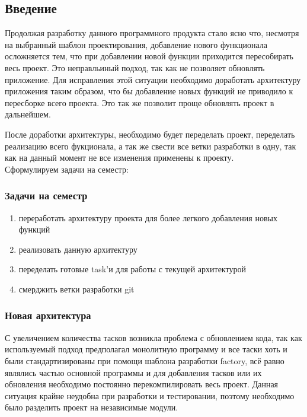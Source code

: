 \subsection{Введение}

Продолжая разработку данного программного продукта стало ясно что, несмотря на выбранный шаблон проектирования, добавление нового функционала осложняется тем, что при добавлении новой функции приходится пересобирать весь проект. Это неправльиный подход, так как не позволяет обновлять приложение. Для исправления этой ситуации необходимо доработать архитектуру приложения таким образом, что бы добавление новых функций не приводило к пересборке всего проекта. Это так же позволит проще обновлять проект в дальнейшем. 

После доработки архитектуры, необходимо будет переделать проект, переделать реализацию всего фукционала, а так же свести все ветки разработки в одну, так как на данный момент не все изменения применены к проекту. \\
Сформулируем задачи на семестр:

\subsubsection{Задачи на семестр}

\begin{enumerate}
\item переработать архитектуру проекта для более легкого добавления новых функций
\item реализовать данную архитектуру
\item переделать готовые task'и для работы с текущей архитектурой
\item смерджить ветки разработки git
\end{enumerate}

\subsubsection{Новая архитектура}

С увеличением количества тасков возникла проблема с обновлением кода, так как используемый подход предполагал монолитную программу и все таски хоть и были стандартизированы при помощи шаблона разработки factory, всё равно являлись частью основной программы и для добавления тасков или их обновления необходимо постоянно перекомпилировать весь проект. Данная ситуация крайне неудобна при разработки и тестировании, поэтому необходимо было разделить проект на независимые модули.

